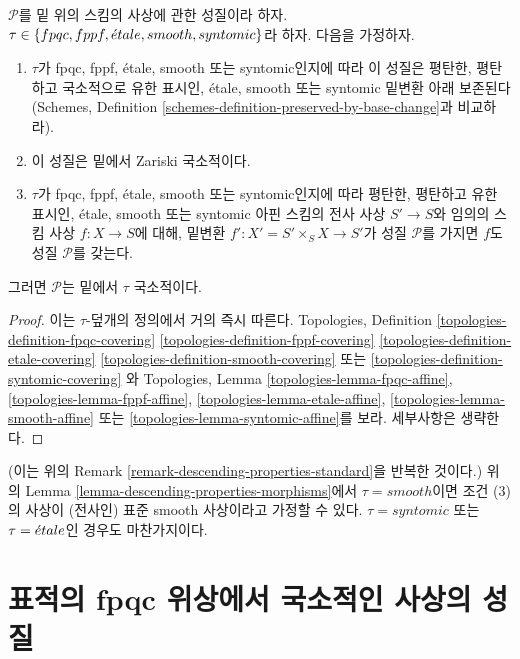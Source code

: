 \begin{lemma}
\label{lemma-descending-properties-morphisms}
\leavevmode\par\noindent
$\mathcal{P}$를 밑 위의 스킴의 사상에 관한 성질이라 하자.
$\tau \in \{fpqc, fppf, {\acute{e}tale}, smooth, syntomic\}$라 하자. 다음을
가정하자.
\begin{enumerate}
\item $\tau$가 fpqc, fppf, \'etale, smooth 또는 syntomic인지에 따라 이
성질은 평탄한, 평탄하고 국소적으로 유한 표시인, \'etale, smooth 또는
syntomic 밑변환 아래 보존된다(Schemes, Definition
\ref{schemes-definition-preserved-by-base-change}과 비교하라).
\item 이 성질은 밑에서 Zariski 국소적이다.
\item $\tau$가 fpqc, fppf, \'etale, smooth 또는 syntomic인지에 따라
평탄한, 평탄하고 유한 표시인, \'etale, smooth 또는 syntomic 아핀 스킴의
전사 사상 $S' \to S$와 임의의 스킴 사상 $f : X \to S$에 대해, 밑변환
$f' : X' = S' \times_S X \to S'$가 성질 $\mathcal{P}$를 가지면
$f$도 성질 $\mathcal{P}$를 갖는다.
\end{enumerate}
그러면 $\mathcal{P}$는 밑에서 $\tau$ 국소적이다.
\end{lemma}

\begin{proof}
이는 $\tau$-덮개의 정의에서 거의 즉시 따른다. Topologies, Definition
\ref{topologies-definition-fpqc-covering}
\ref{topologies-definition-fppf-covering}
\ref{topologies-definition-etale-covering}
\ref{topologies-definition-smooth-covering} 또는
\ref{topologies-definition-syntomic-covering}
와 Topologies, Lemma
\ref{topologies-lemma-fpqc-affine},
\ref{topologies-lemma-fppf-affine},
\ref{topologies-lemma-etale-affine},
\ref{topologies-lemma-smooth-affine} 또는
\ref{topologies-lemma-syntomic-affine}를 보라. 세부사항은 생략한다.
\end{proof}

\begin{remark}
\label{remark-descending-properties-morphisms-standard}
(이는 위의 Remark \ref{remark-descending-properties-standard}을 반복한
것이다.) 위의 Lemma \ref{lemma-descending-properties-morphisms}에서
$\tau = smooth$이면 조건 (3)의 사상이 (전사인) 표준 smooth 사상이라고
가정할 수 있다. $\tau = syntomic$ 또는 $\tau = {\acute{e}tale}$인 경우도
마찬가지이다.
\end{remark}




\section{표적의 fpqc 위상에서 국소적인 사상의 성질}
\label{section-descending-properties-morphisms-fpqc}

